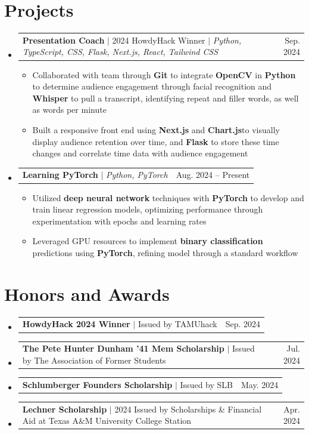 \documentclass[letterpaper,10pt]{article}
\makeatletter
\newcommand{\resumeItem}[1]{
  \item\small{
    {#1 \vspace{-2pt}}
  }
}
\newcommand{\resumeProjectHeading}[2]{
    \item
    \begin{tabular*}{0.97\textwidth}{l@{\extracolsep{\fill}}r}
      \small#1 & #2 \\
    \end{tabular*}\vspace{-7pt}
}
\newcommand{\resumeSubHeadingListStart}{\begin{itemize}[leftmargin=0.15in, label={}]}
\newcommand{\resumeSubHeadingListEnd}{\end{itemize}}
\newcommand{\resumeItemListStart}{\begin{itemize}}
\newcommand{\resumeItemListEnd}{\end{itemize}\vspace{-5pt}}
\makeatother
\begin{document}
\section{Projects}
    \resumeSubHeadingListStart
      \resumeProjectHeading
          {\textbf{Presentation Coach} $|$ 2024 HowdyHack Winner $|$ \emph{Python, TypeScript, CSS, Flask, Next.js, React, Tailwind CSS}}{Sep. 2024}
          \resumeItemListStart
            \resumeItem{Collaborated with team through \textbf{Git} to integrate \textbf{OpenCV} in \textbf{Python} to determine audience engagement through facial recognition and \textbf{Whisper} to pull a transcript, identifying repeat and filler words, as well as words per minute}
            \resumeItem{Built a responsive front end using \textbf{Next.js} and \textbf{Chart.js}to visually display audience retention over time, and \textbf{Flask} to store these time changes and correlate time data with audience engagement}
          \resumeItemListEnd
      \resumeProjectHeading
          {\textbf{Learning PyTorch} $|$ \emph{Python, PyTorch}}{Aug. 2024 -- Present}
          \resumeItemListStart
            \resumeItem{Utilized \textbf{deep neural network} techniques with \textbf{PyTorch} to develop and train linear regression models, optimizing performance through experimentation with epochs and learning rates}
            \resumeItem{Leveraged GPU resources to implement \textbf{binary classification} predictions using \textbf{PyTorch}, refining model through a standard workflow}
          \resumeItemListEnd
            
    \resumeSubHeadingListEnd



%
\section{Honors and Awards}
    \resumeSubHeadingListStart

      \resumeProjectHeading
          {\textbf{HowdyHack 2024 Winner} $|$ Issued by TAMUhack}{Sep. 2024}
      \resumeProjectHeading
          {\textbf{The Pete Hunter Dunham '41 Mem Scholarship} $|$ Issued by The Association of Former Students}{Jul. 2024}
      \resumeProjectHeading
          {\textbf{Schlumberger Founders Scholarship} $|$ Issued by SLB}{May. 2024}
      \resumeProjectHeading
          {\textbf{Lechner Scholarship} $|$ 2024 Issued by Scholarships \& Financial Aid at Texas A\&M University College Station}{Apr. 2024}
             \resumeSubHeadingListEnd
\end{document}
